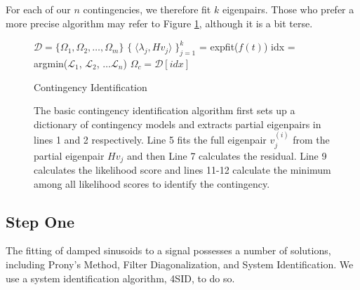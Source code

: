 For each of our $n$ contingencies, we therefore fit $k$ eigenpairs. Those who prefer a more precise algorithm may refer to Figure \ref{algorithmbasic}, although it is a bit terse. 
\begin{figure}[h!]
\begin{algorithm}[H]
\SetAlgoLined
{}
 $\mathcal{D} =  \{ \Omega_1, \Omega_2, \dots, \Omega_m \}$  
 $\{ \; \langle {\lambda_j}, H{v_j} \rangle \; \}_{j = 1}^k$ = expfit($f(t)$)  
 idx = argmin($\mathcal{L}_1$, $\mathcal{L}_2$, $\dots \mathcal{L}_n$) 
 $\Omega_c = \mathcal{D}[idx]$ 
 \caption{Contingency Identification}
 \label{algorithmbasic}
\end{algorithm}
\caption{The basic contingency identification algorithm first sets up a dictionary of contingency models and extracts partial eigenpairs in lines 1 and 2 respectively. Line 5 fits the full eigenpair $v_j^{(i)}$ from the partial eigenpair $Hv_j$ and then Line 7 calculates the residual. Line 9 calculates the likelihood score and lines 11-12 calculate the minimum among all likelihood scores to identify the contingency.}
\end{figure}
\subsection{Step One}
The fitting of damped sinusoids to a signal possesses a number of solutions, including Prony's Method, Filter Diagonalization, and System Identification. We use a system identification algorithm, 4SID, to do so. 

